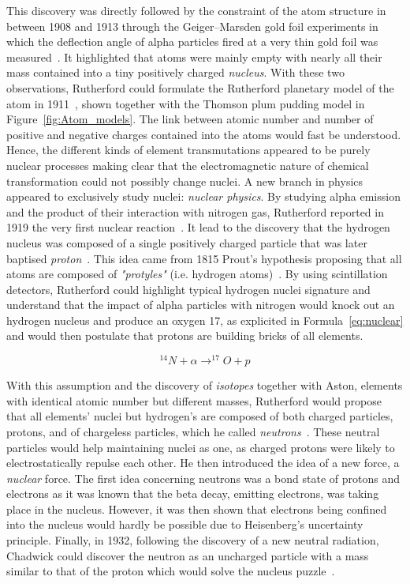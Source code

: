 	This discovery was directly followed by the constraint of the atom structure in between 1908 and 1913 through the Geiger–Marsden gold foil experiments in which the deflection angle of alpha particles fired at a very thin gold foil was measured~\cite{GEIGER1908,GEIGER1909,GEIGER1910,GEIGER1913}. It highlighted that atoms were mainly empty with nearly all their mass contained into a tiny positively charged \textit{nucleus}. With these two observations, Rutherford could formulate the Rutherford planetary model of the atom in 1911~\cite{RUTHERFORD1911}, shown together with the Thomson plum pudding model in Figure~\ref{fig:Atom_models}. The link between atomic number and number of positive and negative charges contained into the atoms would fast be understood. Hence, the different kinds of element transmutations appeared to be purely nuclear processes making clear that the electromagnetic nature of chemical transformation could not possibly change nuclei. A new branch in physics appeared to exclusively study nuclei: \textit{nuclear physics}. By studying alpha emission and the product of their interaction with nitrogen gas, Rutherford reported in 1919 the very first nuclear reaction~\cite{RUTHERFORD1919}. It lead to the discovery that the hydrogen nucleus was composed of a single positively charged particle that was later baptised \textit{proton}~\cite{MASSON1921}. This idea came from 1815 Prout's hypothesis proposing that all atoms are composed of \textit{"protyles"} (i.e. hydrogen atoms)~\cite{PROUT1815,PROUT1816}. By using scintillation detectors, Rutherford could highlight typical hydrogen nuclei signature and understand that the impact of alpha particles with nitrogen would knock out an hydrogen nucleus and produce an oxygen 17, as explicited in Formula~\ref{eq:nuclear} and would then postulate that protons are building bricks of all elements.
	
	\begin{equation}
		\label{eq:nuclear}
		^{14}N + \alpha \rightarrow ^{17}O + p
	\end{equation}
	
	With this assumption and the discovery of \textit{isotopes} together with Aston, elements with identical atomic number but different masses, Rutherford would propose that all elements' nuclei but hydrogen's are composed of both charged particles, protons, and of chargeless particles, which he called \textit{neutrons}~\cite{RUTHERFORD1920,MASSON1921}. These neutral particles would help maintaining nuclei as one, as charged protons were likely to electrostatically repulse each other. He then introduced the idea of a new force, a \textit{nuclear} force. The first idea concerning neutrons was a bond state of protons and electrons as it was known that the beta decay, emitting electrons, was taking place in the nucleus. However, it was then shown that electrons being confined into the nucleus would hardly be possible due to Heisenberg's uncertainty principle. Finally, in 1932, following the discovery of a new neutral radiation, Chadwick could discover the neutron as an uncharged particle with a mass similar to that of the proton which would solve the nucleus puzzle~\cite{BOTHE1930,BOTHE1932,CURIE1932,CHADWICK1932,CHADWICK1933}.
	

